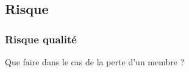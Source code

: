 
\subsection{Risque}
\begin{frame}
  \frametitle{\color{white} Risque qualité}
  Que faire dans le cas de la perte d'un membre ?

\end{frame}


